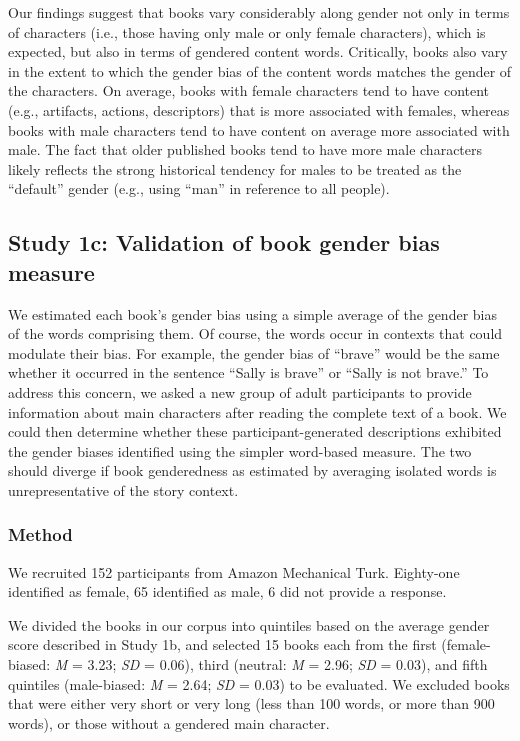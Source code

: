 \documentclass[
  english,
  ,man,floatsintext]{apa6}
\begin{document}
Our findings suggest that books vary considerably along gender not only in terms of characters (i.e., those having only male or only female characters), which is expected, but also in terms of gendered content words. Critically, books also vary in the extent to which the gender bias of the content words matches the gender of the characters. On average, books with female characters tend to have content (e.g., artifacts, actions, descriptors) that is more associated with females, whereas books with male characters tend to have content on average more associated with male. The fact that older published books tend to have more male characters likely reflects the strong historical tendency for males to be treated as the ``default'' gender (e.g., using ``man'' in reference to all people).

\hypertarget{study-1c-validation-of-book-gender-bias-measure}{%
\subsection{Study 1c: Validation of book gender bias measure}\label{study-1c-validation-of-book-gender-bias-measure}}

We estimated each book's gender bias using a simple average of the gender bias of the words comprising them. Of course, the words occur in contexts that could modulate their bias. For example, the gender bias of ``brave'' would be the same whether it occurred in the sentence ``Sally is brave'' or ``Sally is not brave.'' To address this concern, we asked a new group of adult participants to provide information about main characters after reading the complete text of a book. We could then determine whether these participant-generated descriptions exhibited the gender biases identified using the simpler word-based measure. The two should diverge if book genderedness as estimated by averaging isolated words is unrepresentative of the story context.

\hypertarget{method-2}{%
\subsubsection{Method}\label{method-2}}

We recruited 152 participants from Amazon Mechanical Turk. Eighty-one identified as female, 65 identified as male, 6 did not provide a response.

We divided the books in our corpus into quintiles based on the average gender score described in Study 1b, and selected 15 books each from the first (female-biased: \emph{M} = 3.23; \emph{SD} = 0.06), third (neutral: \emph{M} = 2.96; \emph{SD} = 0.03), and fifth quintiles (male-biased: \emph{M} = 2.64; \emph{SD} = 0.03) to be evaluated. We excluded books that were either very short or very long (less than 100 words, or more than 900 words), or those without a gendered main character.
\end{document}
